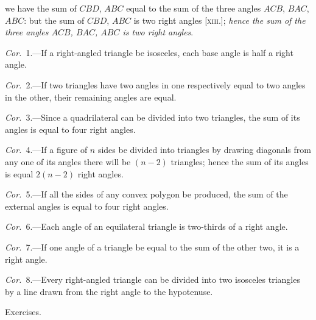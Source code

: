 \documentclass[oneside]{book}
\newcommand\exhead[1]{
\Needspace*{5\baselineskip}\begin{center}
\textsf{#1}
\end{center}
}
\begin{document}
we have the sum of $CBD$, $ABC$ equal to the sum of the
three angles $ACB$, $BAC$, $ABC$: but the sum of $CBD$,
$ABC$ is two right angles [\textsc{xiii}.]; \emph{hence the sum of the
three angles $ACB$, $BAC$, $ABC$ is two right angles}.

\emph{Cor.}~1.---If a right-angled triangle be isosceles, each
base angle is half a right angle.

\emph{Cor.}~2.---If two triangles have two angles in one
respectively equal to two angles in the other, their
remaining angles are equal.

\emph{Cor.}~3.---Since a quadrilateral can be divided into
two triangles, the sum of its angles is equal to four
right angles.

\emph{Cor.}~4.---If a figure of $n$ sides be divided into triangles
by drawing diagonals from any one of its angles
there will be $(n-2)$ triangles; hence the sum of its
angles is equal $2(n-2)$ right angles.

\emph{Cor.}~5.---If all the sides of any convex polygon be
produced, the sum of the external angles is equal to
four right angles.

\emph{Cor.}~6.---Each angle of an equilateral triangle is
two-thirds of a right angle.

\emph{Cor.}~7.---If one angle of a triangle be equal to the
sum of the other two, it is a right angle.

\emph{Cor.}~8.---Every right-angled triangle can be divided
into two isosceles triangles by a line drawn from the
right angle to the hypotenuse.


\exhead{Exercises.}
\end{document}
